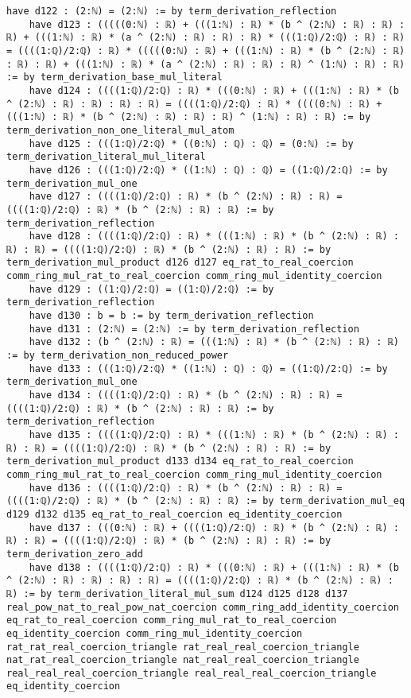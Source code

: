 \documentclass{article}
\begin{document}
\begin{tcolorbox}[colback=white!10, width=\linewidth]
\begin{lstlisting}[language=Lean4]
    have d122 : (2:ℕ) = (2:ℕ) := by term_derivation_reflection
    have d123 : (((((0:ℕ) : ℝ) + (((1:ℕ) : ℝ) * (b ^ (2:ℕ) : ℝ) : ℝ) : ℝ) + (((1:ℕ) : ℝ) * (a ^ (2:ℕ) : ℝ) : ℝ) : ℝ) * (((1:ℚ)/2:ℚ) : ℝ) : ℝ) = ((((1:ℚ)/2:ℚ) : ℝ) * (((((0:ℕ) : ℝ) + (((1:ℕ) : ℝ) * (b ^ (2:ℕ) : ℝ) : ℝ) : ℝ) + (((1:ℕ) : ℝ) * (a ^ (2:ℕ) : ℝ) : ℝ) : ℝ) ^ (1:ℕ) : ℝ) : ℝ) := by term_derivation_base_mul_literal
    have d124 : ((((1:ℚ)/2:ℚ) : ℝ) * (((0:ℕ) : ℝ) + (((1:ℕ) : ℝ) * (b ^ (2:ℕ) : ℝ) : ℝ) : ℝ) : ℝ) = ((((1:ℚ)/2:ℚ) : ℝ) * ((((0:ℕ) : ℝ) + (((1:ℕ) : ℝ) * (b ^ (2:ℕ) : ℝ) : ℝ) : ℝ) ^ (1:ℕ) : ℝ) : ℝ) := by term_derivation_non_one_literal_mul_atom
    have d125 : (((1:ℚ)/2:ℚ) * ((0:ℕ) : ℚ) : ℚ) = (0:ℕ) := by term_derivation_literal_mul_literal
    have d126 : (((1:ℚ)/2:ℚ) * ((1:ℕ) : ℚ) : ℚ) = ((1:ℚ)/2:ℚ) := by term_derivation_mul_one
    have d127 : ((((1:ℚ)/2:ℚ) : ℝ) * (b ^ (2:ℕ) : ℝ) : ℝ) = ((((1:ℚ)/2:ℚ) : ℝ) * (b ^ (2:ℕ) : ℝ) : ℝ) := by term_derivation_reflection
    have d128 : ((((1:ℚ)/2:ℚ) : ℝ) * (((1:ℕ) : ℝ) * (b ^ (2:ℕ) : ℝ) : ℝ) : ℝ) = ((((1:ℚ)/2:ℚ) : ℝ) * (b ^ (2:ℕ) : ℝ) : ℝ) := by term_derivation_mul_product d126 d127 eq_rat_to_real_coercion comm_ring_mul_rat_to_real_coercion comm_ring_mul_identity_coercion
    have d129 : ((1:ℚ)/2:ℚ) = ((1:ℚ)/2:ℚ) := by term_derivation_reflection
    have d130 : b = b := by term_derivation_reflection
    have d131 : (2:ℕ) = (2:ℕ) := by term_derivation_reflection
    have d132 : (b ^ (2:ℕ) : ℝ) = (((1:ℕ) : ℝ) * (b ^ (2:ℕ) : ℝ) : ℝ) := by term_derivation_non_reduced_power
    have d133 : (((1:ℚ)/2:ℚ) * ((1:ℕ) : ℚ) : ℚ) = ((1:ℚ)/2:ℚ) := by term_derivation_mul_one
    have d134 : ((((1:ℚ)/2:ℚ) : ℝ) * (b ^ (2:ℕ) : ℝ) : ℝ) = ((((1:ℚ)/2:ℚ) : ℝ) * (b ^ (2:ℕ) : ℝ) : ℝ) := by term_derivation_reflection
    have d135 : ((((1:ℚ)/2:ℚ) : ℝ) * (((1:ℕ) : ℝ) * (b ^ (2:ℕ) : ℝ) : ℝ) : ℝ) = ((((1:ℚ)/2:ℚ) : ℝ) * (b ^ (2:ℕ) : ℝ) : ℝ) := by term_derivation_mul_product d133 d134 eq_rat_to_real_coercion comm_ring_mul_rat_to_real_coercion comm_ring_mul_identity_coercion
    have d136 : ((((1:ℚ)/2:ℚ) : ℝ) * (b ^ (2:ℕ) : ℝ) : ℝ) = ((((1:ℚ)/2:ℚ) : ℝ) * (b ^ (2:ℕ) : ℝ) : ℝ) := by term_derivation_mul_eq d129 d132 d135 eq_rat_to_real_coercion eq_identity_coercion
    have d137 : (((0:ℕ) : ℝ) + ((((1:ℚ)/2:ℚ) : ℝ) * (b ^ (2:ℕ) : ℝ) : ℝ) : ℝ) = ((((1:ℚ)/2:ℚ) : ℝ) * (b ^ (2:ℕ) : ℝ) : ℝ) := by term_derivation_zero_add
    have d138 : ((((1:ℚ)/2:ℚ) : ℝ) * (((0:ℕ) : ℝ) + (((1:ℕ) : ℝ) * (b ^ (2:ℕ) : ℝ) : ℝ) : ℝ) : ℝ) = ((((1:ℚ)/2:ℚ) : ℝ) * (b ^ (2:ℕ) : ℝ) : ℝ) := by term_derivation_literal_mul_sum d124 d125 d128 d137 real_pow_nat_to_real_pow_nat_coercion comm_ring_add_identity_coercion eq_rat_to_real_coercion comm_ring_mul_rat_to_real_coercion eq_identity_coercion comm_ring_mul_identity_coercion rat_rat_real_coercion_triangle rat_real_real_coercion_triangle nat_rat_real_coercion_triangle nat_real_real_coercion_triangle real_real_real_coercion_triangle real_real_real_coercion_triangle eq_identity_coercion

\end{lstlisting}
\end{tcolorbox}
\end{document}
